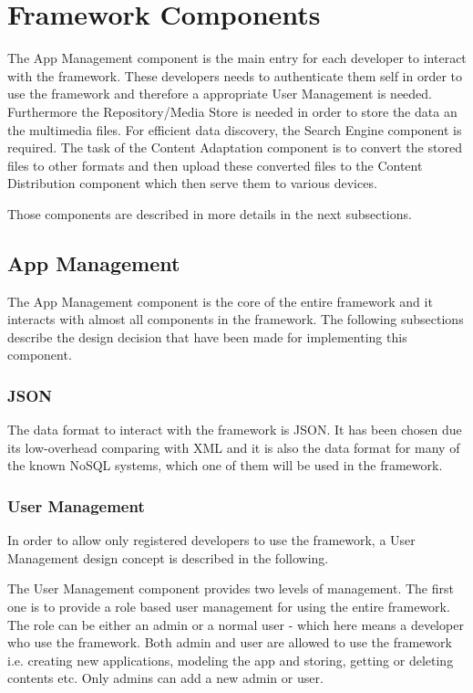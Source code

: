 \section{Framework Components\label{sec:des_com}}
The App Management component is the main entry for each developer to interact with the framework. These developers needs to authenticate them self in order to use the framework and therefore a appropriate User Management is needed. Furthermore the Repository/Media Store is needed in order to store the data an the multimedia files. For efficient data discovery, the Search Engine component  is required. The task of the Content Adaptation component is to convert the stored files to other formats and then upload these converted files to the Content Distribution component which then serve them to various devices.

Those components are described in more details in the next subsections.
 
\subsection{App Management\label{sec:des_app_man}}

The App Management component is the core of the entire framework and it interacts with almost all components in the framework. The following subsections describe the design decision that have been made for implementing this component.

\subsubsection{JSON}
The data format to interact with the framework is JSON. It has been chosen due its low-overhead comparing with XML and it is also the data format for many of the known NoSQL systems, which one of them will be used in the framework.
 
\subsubsection{User Management \label{sec:des_user_man}}
In order to allow only registered developers to use the framework, a User Management design concept is described in the following.

The User Management component provides two levels of management. The first one is to provide a role based user management for using the entire framework. The role can be either an admin or a normal user - which here means a developer who use the framework. Both admin and user are allowed to use the framework i.e. creating new applications, modeling the app and storing, getting or deleting contents etc. Only admins can add a new admin or user.

